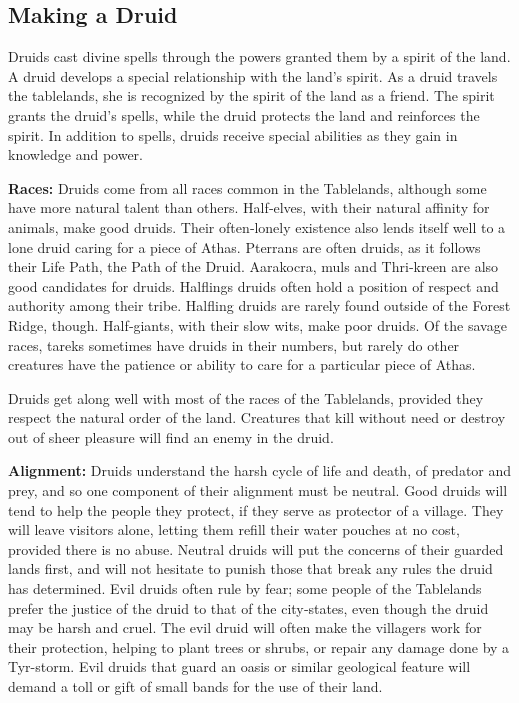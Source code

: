 \subsection{Making a Druid}

Druids cast divine spells through the powers granted them by a spirit of the land. A druid develops a special relationship with the land's spirit. As a druid travels the tablelands, she is recognized by the spirit of the land as a friend. The spirit grants the druid's spells, while the druid protects the land and reinforces the spirit. In addition to spells, druids receive special abilities as they gain in knowledge and power.

\textbf{Races:} Druids come from all races common in the Tablelands, although some have more natural talent than others. Half‐elves, with their natural affinity for animals, make good druids. Their often‐lonely existence also lends itself well to a lone druid caring for a piece of Athas. Pterrans are often druids, as it follows their Life Path, the Path of the Druid. Aarakocra, muls and Thri‐kreen are also good candidates for druids. Halflings druids often hold a position of respect and authority among their tribe. Halfling druids are rarely found outside of the Forest Ridge, though. Half‐giants, with their slow wits, make poor druids. Of the savage races, tareks sometimes have druids in their numbers, but rarely do other creatures have the patience or ability to care for a particular piece of Athas.

Druids get along well with most of the races of the Tablelands, provided they respect the natural order of the land. Creatures that kill without need or destroy out of sheer pleasure will find an enemy in the druid.

\textbf{Alignment:} Druids understand the harsh cycle of life and death, of predator and prey, and so one component of their alignment must be neutral. Good druids will tend to help the people they protect, if they serve as protector of a village. They will leave visitors alone, letting them refill their water pouches at no cost, provided there is no abuse. Neutral druids will put the concerns of their guarded lands first, and will not hesitate to punish those that break any rules the druid has determined. Evil druids often rule by fear; some people of the Tablelands prefer the justice of the druid to that of the city‐states, even though the druid may be harsh and cruel. The evil druid will often make the villagers work for their protection, helping to plant trees or shrubs, or repair any damage done by a Tyr-storm. Evil druids that guard an oasis or similar geological feature will demand a toll or gift of small bands for the use of their land.


